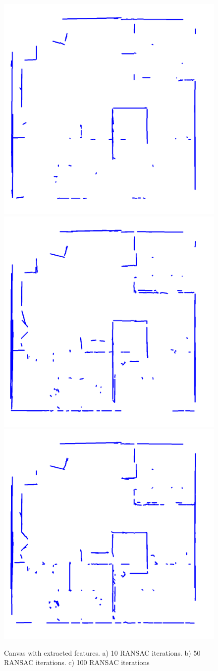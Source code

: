 \documentclass[twoside,conference,a4paper]{IEEEtran}
\begin{document}
\begin{figure}[H]
    \centering
    \includegraphics[scale=0.5,width=0.5\hsize]{figures/all_features-10-iter.png}
    \includegraphics[scale=0.5,width=0.5\hsize]{figures/all_features-50-iter.png}
    \includegraphics[scale=0.5,width=0.5\hsize]{figures/all_features-100-iter.png}
    \caption{Canvas with extracted features. a) 10 RANSAC iterations. b) 50 RANSAC iterations. c) 100 RANSAC iterations}
    \label{fig:canvas-features}
\end{figure}
\end{document}
